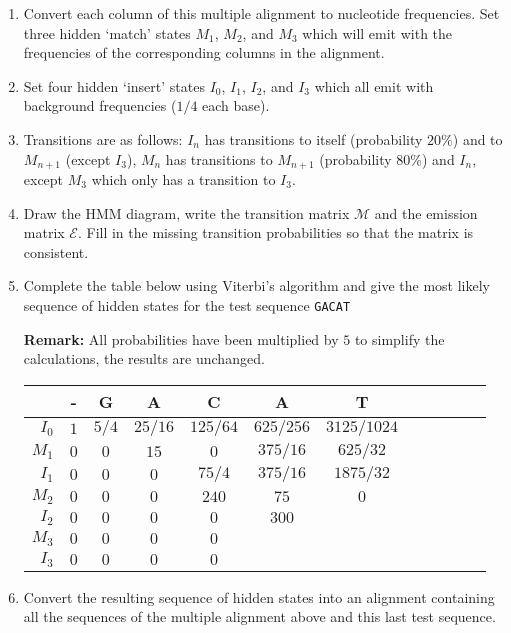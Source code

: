 \documentclass[a4paper,11pt]{article}
\begin{document}
\begin{enumerate}
\item Convert each column of this multiple alignment to nucleotide
  frequencies. Set three hidden `match' states $M_1$, $M_2$, and $M_3$
  which will emit with the frequencies of the corresponding columns in
  the alignment.
\item Set four hidden `insert' states $I_0$, $I_1$, $I_2$, and $I_3$ which
  all emit with background frequencies ($1/4$ each base).
\item Transitions are as follows: $I_n$ has transitions to itself
  (probability $20\%$) and to $M_{n+1}$ (except $I_3$), $M_n$ has transitions to
  $M_{n+1}$ (probability $80\%$) and $I_n$, except $M_3$ which only has a transition
  to $I_3$.
\item Draw the HMM diagram, write the transition matrix $\mathcal{M}$ and the
  emission matrix $\mathcal{E}$. Fill in the missing transition probabilities
  so that the matrix is consistent.
\item Complete the table below using Viterbi's algorithm and give the
  most likely sequence of hidden states 
  for the test sequence \texttt{GACAT}

  \textbf{Remark:} All
  probabilities have been multiplied by $5$ to simplify the
  calculations, the results are unchanged.  
\begin{table}[h]
  \begin{center}
    \begin{tabular}{rccccccccccc}
      \toprule
      & - & G & A & C & A & T \\
      \midrule
      $I_0$&$1$&$5/4$&$25/16$&$125/64$&$625/256$&$3125/1024$\\
      $M_1$&$0$&$0  $&$15   $&$0     $&$375/16 $&$625/32   $\\
      $I_1$&$0$&$0  $&$0    $&$75/4  $&$375/16 $&$1875/32  $\\
      $M_2$&$0$&$0  $&$0    $&$240   $&$75     $&$0        $\\
      $I_2$&$0$&$0  $&$0    $&$0     $&$300    $&$    $\\
      $M_3$&$0$&$0  $&$0    $&$0     $&$       $&$     $\\
      $I_3$&$0$&$0  $&$0    $&$0     $&$       $&$        $\\
      \bottomrule
    \end{tabular}
  \end{center}
\end{table}

\item Convert the resulting sequence of hidden states into an
  alignment containing all the sequences of the multiple alignment
  above and this last test sequence.
\end{enumerate}
\end{document}
